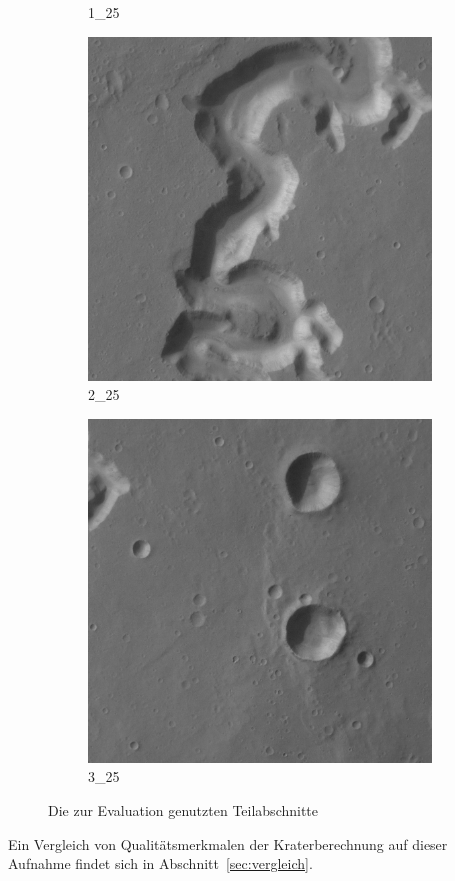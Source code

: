 \begin{figure}[H]
\begin{subfigure}{0.3\textwidth}
		\caption{1\_25}
	\end{subfigure}
	\begin{subfigure}{0.3\textwidth}
		\centering
		\includegraphics[width=\textwidth,keepaspectratio]{images/h0905_0000/2_25.jpg}
		\caption{2\_25}
	\end{subfigure}
	\begin{subfigure}{0.3\textwidth}
		\centering
		\includegraphics[width=\textwidth,keepaspectratio]{images/h0905_0000/3_25.jpg}
		\caption{3\_25}
	\end{subfigure}
	\caption{Die zur Evaluation genutzten Teilabschnitte}
	\label{fig:h0905_0000}
\end{figure}

Ein Vergleich von Qualitätsmerkmalen der Kraterberechnung auf dieser Aufnahme findet sich in Abschnitt~\ref{sec:vergleich}.
